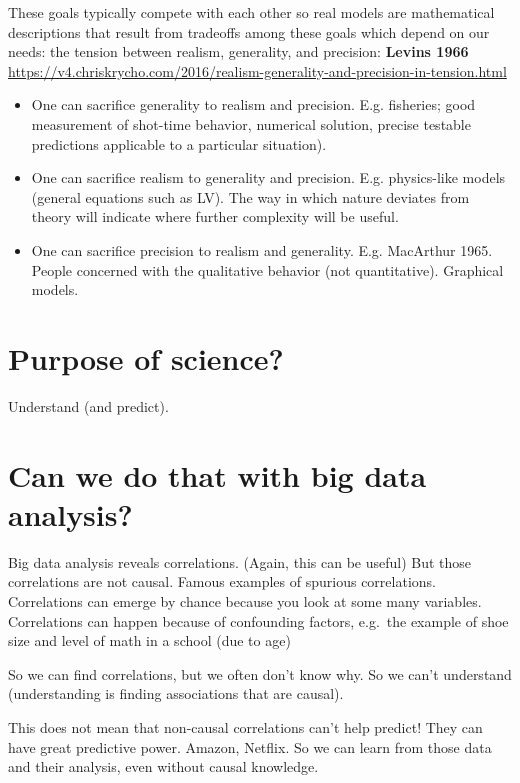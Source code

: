 \documentclass[
]{book}
\theoremstyle{definition}
\theoremstyle{definition}
\theoremstyle{definition}
\theoremstyle{definition}
\theoremstyle{remark}
\begin{document}
These goals typically compete with each other so real models are mathematical descriptions that result from tradeoffs among these goals which depend on our needs: the tension between realism, generality, and precision:
\textbf{Levins 1966}
\url{https://v4.chriskrycho.com/2016/realism-generality-and-precision-in-tension.html}

\begin{itemize}
\item
  One can sacrifice generality to realism and precision. E.g. fisheries; good measurement of shot-time behavior, numerical solution, precise testable predictions applicable to a particular situation).
\item
  One can sacrifice realism to generality and precision. E.g. physics-like models (general equations such as LV). The way in which nature deviates from theory will indicate where further complexity will be useful.
\item
  One can sacrifice precision to realism and generality. E.g. MacArthur 1965. People concerned with the qualitative behavior (not quantitative). Graphical models.
\end{itemize}

\section{Purpose of science?}\label{purpose-of-science}

Understand (and predict).

\section{Can we do that with big data analysis?}\label{can-we-do-that-with-big-data-analysis}

Big data analysis reveals correlations. (Again, this can be useful)
But those correlations are not causal.
Famous examples of spurious correlations.
Correlations can emerge by chance because you look at some many variables.
Correlations can happen because of confounding factors, e.g.~the example of shoe size and level of math in a school (due to age)

So we can find correlations, but we often don't know why. So we can't understand (understanding is finding associations that are causal).

This does not mean that non-causal correlations can't help predict! They can have great predictive power. Amazon, Netflix.
So we can learn from those data and their analysis, even without causal knowledge.
\end{document}
